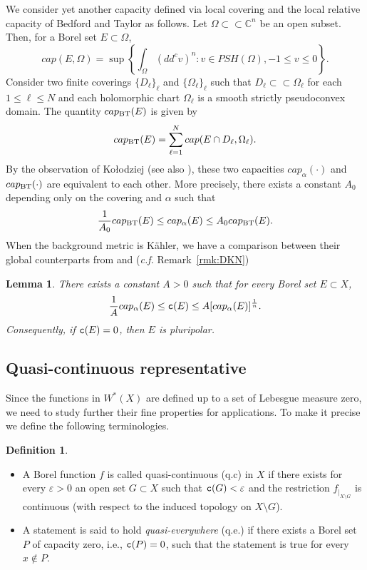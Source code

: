 \documentclass{amsart}
\newcommand{\veps}{\varepsilon}
\newcommand{\al}{\alpha}
\newcommand{\tc}{{\tt c}}
\newcommand{\Om}{\Omega}
\newcommand{\bC}{\mathbb{C}}
\newtheorem{lem}[thm]{Lemma}
\theoremstyle{definition}
\newtheorem{defn}[thm]{Definition}
\numberwithin{thm}{section}
\numberwithin{equation}{section}
\renewcommand{\[}{\begin{equation}}
\renewcommand{\]}{\end{equation}}
\begin{document}
We consider  yet another capacity defined via local covering and the local relative capacity of Bedford and Taylor \cite{BT82}  as follows. Let $\Om \subset\subset \bC^n$ be an open subset. Then,  for a Borel set $E\subset \Om$, 
\[
	cap(E, \Om) = \sup\left\{ \int_\Om (dd^c v)^n : v\in PSH(\Om), -1 \leq v \leq 0\right\}.
\]
Consider two finite coverings $\{D_\ell\}_{\ell}$ and  $\{\Om_\ell\}_{\ell}$ such that $D_\ell \subset \subset \Om_\ell$ for each $1\leq \ell \leq N$ and each holomorphic chart $\Om_\ell$ is a smooth strictly pseudoconvex domain. The  quantity $cap_{\rm BT}(E)$ is given by 
$$
	cap_{\rm BT}(E) = \sum_{\ell=1}^N cap(E \cap D_\ell, \Om_\ell).
$$
By the observation of Ko\l odziej \cite[Page 670]{Ko03}  (see also \cite[Proposition~9.8]{GZ-book}), these two capacities $cap_\al(\cdot)$ and $cap_{\rm BT}(\cdot)$ are equivalent to each other. More precisely,  there exists a constant $A_0$ depending only on the covering and $\al$ such that
\[\label{eq:cap-loc-vs-glob}
	\frac{1}{A_0}  cap_{\rm BT}(E) \leq cap_\al(E)  \leq A_0 cap_{\rm BT}(E).
\]
 When the background metric is K\"ahler,
we have a comparison between their global counterparts from \cite[Theorem 28]{Vigny} and \cite[Proposition~5.1]{DKN} ({\em c.f.} Remark~\ref{rmk:DKN})


\begin{lem}\label{lem:cap-c} There exists a constant $A>0$ such that for every Borel set $E\subset X$,
$$
	\frac{1}{A} cap_\al(E) \leq  \tc(E) \leq A [cap_\al(E)]^\frac{1}{n}.
$$
Consequently, if $\tc (E) =0$, then $E$ is pluripolar.
\end{lem}

\subsection{Quasi-continuous representative} Since the functions in $W^*(X)$ are defined up to a set of Lebesgue measure zero,
we need to study further their fine properties for applications. To make it precise we define the following terminologies.


\begin{defn} \label{defn:c-quasi-c}
\begin{itemize}
\item
[(a)] A Borel function  $f$ is called quasi-continuous (q.c) in $X$ if there exists for every $\veps> 0$ an open set $G \subset X$ such that $\tc (G)<\veps$ and the restriction $f_{|_{X\setminus G}}$  is continuous  (with respect to the induced topology on $X\setminus G$).
\item
[(b)] A statement is said to hold {\em quasi-everywhere} (q.e.) if there exists a Borel set $P$ of capacity zero, i.e., $\tc (P) =0$, such that the statement is true for every $x\notin P$. 
\end{itemize}
\end{defn}
\end{document}
